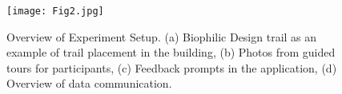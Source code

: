 \begin{figure}
\begin{center}
\texttt{[image: Fig2.jpg]}
\caption{Overview of Experiment Setup. (a) Biophilic Design trail as an example of trail placement in the building, (b) Photos from guided tours for participants, (c) Feedback prompts in the application, (d) Overview of data communication.}
\label{fig:experiments}
\end{center}
\end{figure}

